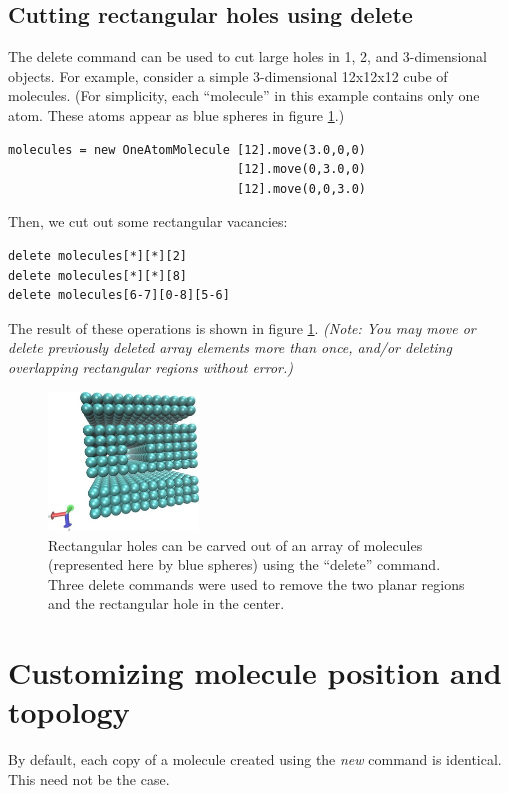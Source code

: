 \documentclass[11pt]{article}
\begin{document}
\subsection{Cutting rectangular holes using \textbf{delete}}
\label{sec:delete_holes}
The delete command can be used to cut large holes in 
1, 2, and 3-dimensional objects.
For example, consider a simple 3-dimensional 12x12x12 cube of molecules.
(For simplicity, each ``molecule'' in this example contains only one atom.
 These atoms appear as blue spheres in figure \ref{fig:delete_holes}.)
\begin{verbatim}
molecules = new OneAtomMolecule [12].move(3.0,0,0)
                                [12].move(0,3.0,0)
                                [12].move(0,0,3.0)
\end{verbatim}
Then, we cut out some rectangular vacancies:
\begin{verbatim}
delete molecules[*][*][2]      
delete molecules[*][*][8]      
delete molecules[6-7][0-8][5-6]
\end{verbatim}
The result of these operations is shown in figure
\ref{fig:delete_holes}.
\textit{(Note: You may move or delete previously deleted array elements
         more than once, and/or deleting overlapping rectangular regions
         without error.)}

\begin{figure}[htbp]
\centering
\includegraphics[width=4.0cm]{delete_holes1.jpg}
\caption{
\label{fig:delete_holes}
Rectangular holes can be carved out of an array of molecules
(represented here by blue spheres)
using the ``delete'' command.  Three delete commands were used to
remove the two planar regions and the rectangular hole in the center.
}
\end{figure}






\section{Customizing molecule position and topology}
\label{sec:custom_xform}
By default, each copy of a molecule created using the \textit{new}
command is identical.  This need not be the case.
\end{document}
